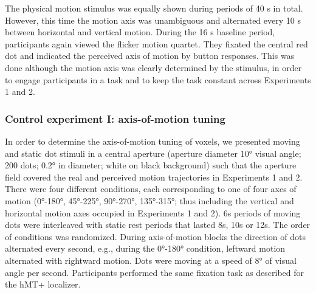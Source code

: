 The physical motion stimulus was equally shown during periods of 40 s in total. However, this time the motion axis was unambiguous and alternated every 10 s between horizontal and vertical motion. During the 16 s baseline period, participants again viewed the flicker motion quartet. They fixated the central red dot and indicated the perceived axis of motion by button responses. This was done although the motion axis was clearly determined by the stimulus, in order to engage participants in a task and to keep the task constant across Experiments 1 and 2.

\subsubsection{Control experiment I: axis-of-motion tuning}
In order to determine the axis-of-motion tuning of voxels, we presented moving and static dot stimuli in a central aperture (aperture diameter 10° visual angle; 200 dots; 0.2° in diameter; white on black background) such that the aperture field covered the real and perceived motion trajectories in Experiments 1 and 2. There were four different conditions, each corresponding to one of four axes of motion (0°-180°, 45°-225°, 90°-270°, 135°-315°; thus including the vertical and horizontal motion axes occupied in Experiments 1 and 2). 6s periods of moving dots were interleaved with static rest periods that lasted 8s, 10s or 12s. The order of conditions was randomized. During axis-of-motion blocks the direction of dots alternated every second, e.g., during the 0°-180° condition, leftward motion alternated with rightward motion. Dots were moving at a speed of 8° of visual angle per second. Participants performed the same fixation task as described for the hMT+ localizer.

